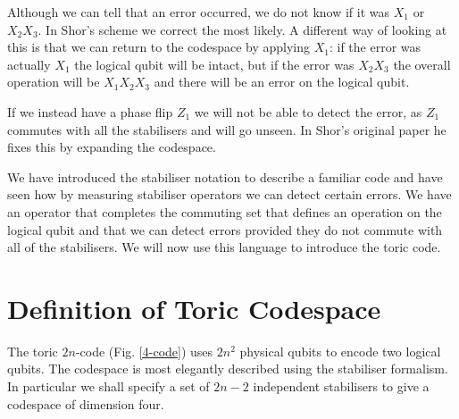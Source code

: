 Although we can tell that an error occurred, we do not know if it was $X_1$ or $X_2X_3$. In Shor's scheme we correct the most likely. A different way of looking at this is that we can return to the codespace by applying $X_1$: if the error was actually $X_1$ the logical qubit will be intact, but if the error was $X_2X_3$ the overall operation will be $X_1X_2X_3$ and there will be an error on the logical qubit.

If we instead have a phase flip $Z_1$ we will not be able to detect the error, as $Z_1$ commutes with all the stabilisers and will go unseen. In Shor's original paper he fixes this by expanding the codespace.

We have introduced the stabiliser notation to describe a familiar code and have seen how by measuring stabiliser operators we can detect certain errors. We have an operator that completes the commuting set that defines an operation on the logical qubit and that we can detect errors provided they do not commute with all of the stabilisers. We will now use this language to introduce the toric code.

\section{Definition of Toric Codespace}

The toric $2n$-code (Fig. \ref{4-code}) uses $2n^2$ physical qubits to encode two logical qubits. The codespace is most elegantly described using the stabiliser formalism. In particular we shall specify a set of $2n - 2$ independent stabilisers to give a codespace of dimension four.

